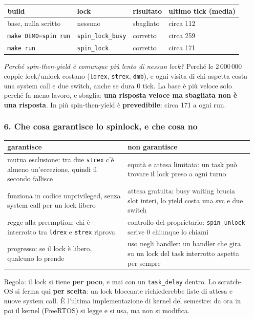 \begin{center}
\small
\begin{tabular}{P{0.3} P{0.22} P{0.13} P{0.25}}
    \hline
    \textbf{build} & \textbf{lock} & \textbf{risultato} & \textbf{ultimo tick (media)} \\
    \hline
    base, nulla scritto & nessuno & sbagliato & circa 112 \\
    \texttt{make DEMO=spin run} & \texttt{spin\_lock\_busy} & corretto & circa 259 \\
    \texttt{make run} & \texttt{spin\_lock} & corretto & circa 171 \\
    \hline
\end{tabular}
\end{center}
\emph{Perché spin-then-yield è comunque più lento di nessun lock?} Perché le 2\,000\,000 coppie lock/unlock costano (\texttt{ldrex}, \texttt{strex}, \texttt{dmb}), e ogni visita di chi aspetta costa una system call e due switch, anche se dura 0 tick. La base è più veloce solo perché fa meno lavoro, e sbaglia: \textbf{una risposta veloce ma sbagliata non è una risposta}. In più spin-then-yield è \textbf{prevedibile}: circa 171 a ogni run.

\subsubsection*{6. Che cosa garantisce lo spinlock, e che cosa no}
\begin{center}
\small
\begin{tabular}{P{0.45} P{0.45}}
    \hline
    \textbf{garantisce} & \textbf{non garantisce} \\
    \hline
    mutua esclusione: tra due \texttt{strex} c'è almeno un'eccezione, quindi il secondo fallisce & equità e attesa limitata: un task può trovare il lock preso a ogni turno \\
    funziona in codice unprivileged, senza system call per un lock libero & attesa gratuita: busy waiting brucia slot interi, lo yield costa una svc e due switch \\
    regge alla preemption: chi è interrotto tra \texttt{ldrex} e \texttt{strex} riprova & controllo del proprietario: \texttt{spin\_unlock} scrive 0 chiunque lo chiami \\
    progresso: se il lock è libero, qualcuno lo prende & uso negli handler: un handler che gira su un lock del task interrotto aspetta per sempre \\
    \hline
\end{tabular}
\end{center}
Regola: il lock si tiene \textbf{per poco}, e mai con un \texttt{task\_delay} dentro. Lo scratch-OS si ferma qui \textbf{per scelta}: un lock bloccante richiederebbe liste di attesa e nuove system call. È l'ultima implementazione di kernel del semestre: da ora in poi il kernel (FreeRTOS) si legge e si usa, ma non si modifica.

